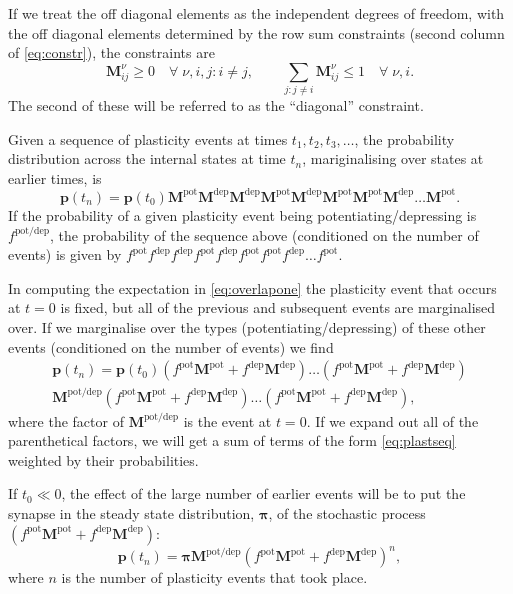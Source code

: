 \documentclass[12pt]{article}
\newcommand{\pr}{\mathbf{p}}
\newcommand{\eq}{\pib}
\newcommand{\pib}{\boldsymbol{\pi}}
\newcommand{\M}{\mathbf{M}}
\newcommand{\pot}{^{\text{pot}}}
\newcommand{\dep}{^{\text{dep}}}
\newcommand{\potdep}{^{\text{pot/dep}}}
\begin{document}
If we treat the off diagonal elements as the independent degrees of freedom, with the off diagonal elements determined by the row sum constraints (second column of \eqref{eq:constr}), the constraints are
%
\begin{equation}\label{eq:constri}
  \M^\nu_{i j} \geq 0
    \quad \forall \; \nu, i, j : i \neq j, \qquad
  \sum_{j : j\neq i} \M^\nu_{ij} \leq 1
    \quad \forall \; \nu, i.
\end{equation}
%
The second of these will be referred to as the ``diagonal'' constraint.

Given a sequence of plasticity events at times $t_1,t_2,t_3,\ldots$, the probability distribution across the internal states at time $t_n$, 
mariginalising over states at earlier times, is
%
\begin{equation}\label{eq:plastseq}
  \pr(t_n) = \pr(t_0)  \M\pot \M\dep \M\dep \M\pot \M\dep \M\pot \M\pot \M\dep \ldots \M\pot .
\end{equation}
%
If the probability of a given plasticity event being potentiating/depressing is $f\potdep$, the probability of the sequence above (conditioned on the number of events) is given by $f\pot f\dep f\dep f\pot f\dep f\pot f\pot f\dep \ldots f\pot$.

In computing the expectation in \eqref{eq:overlapone} the plasticity event that occurs at $t=0$ is fixed, but all of the previous and subsequent events are marginalised over.
If we marginalise over the types (potentiating/depressing) of these other events (conditioned on the number of events) we find
%
\begin{multline}\label{eq:plastseqtypes}
  \pr(t_n) = \pr(t_0) (f\pot\M\pot+f\dep\M\dep)  \ldots (f\pot\M\pot+f\dep\M\dep) \\
    \M\potdep (f\pot\M\pot+f\dep\M\dep) \ldots (f\pot\M\pot+f\dep\M\dep),
\end{multline}
%
where the factor of $\M\potdep$ is the event at $t=0$.
If we expand out all of the parenthetical factors, we will get a sum of terms of the form \eqref{eq:plastseq} weighted by their probabilities.

If $t_0 \ll 0$, the effect of the large number of earlier events will be to put the synapse in the steady state distribution, $\eq$, of the stochastic process $(f\pot\M\pot+f\dep\M\dep)$:
%
\begin{equation}\label{eq:plastseqeq}
  \pr(t_n) = \eq \M\potdep (f\pot\M\pot+f\dep\M\dep)^n,
\end{equation}
%
where $n$ is the number of plasticity events that took place.
\end{document}
